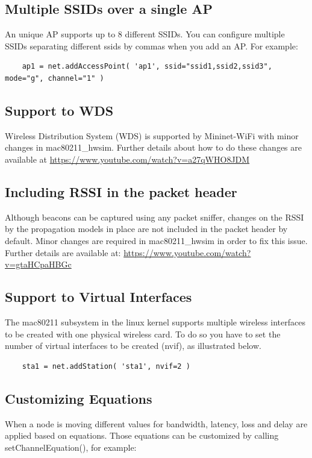\subsection{Multiple SSIDs over a single AP}
An unique AP supports up to 8 different SSIDs. You can configure multiple SSIDs separating different ssids by commas when you add an AP. For example:

\begin{verbatim}
    ap1 = net.addAccessPoint( 'ap1', ssid="ssid1,ssid2,ssid3", mode="g", channel="1" )
\end{verbatim}

\subsection{Support to WDS}
Wireless Distribution System (WDS) is supported by Mininet-WiFi with minor changes in mac80211\_hwsim. Further details about how to do these changes are available at \url{https://www.youtube.com/watch?v=a27qWHO8JDM}

\subsection{Including RSSI in the packet header}
Although beacons can be captured using any packet sniffer, changes on the RSSI by the propagation models in place are
not included in the packet header by default. Minor changes are required in mac80211\_hwsim in order to fix this issue. Further details are available at: \url{https://www.youtube.com/watch?v=gtaHCpaHBGc}

\subsection{Support to Virtual Interfaces}

The mac80211 subsystem in the linux kernel supports multiple wireless interfaces to be created with one physical wireless card. To do so you have to set the number of virtual interfaces to be created (nvif), as illustrated below.

\begin{verbatim}
    sta1 = net.addStation( 'sta1', nvif=2 )
\end{verbatim}

\subsection{Customizing Equations}
When a node is moving different values for bandwidth, latency, loss and delay are applied based on equations. Those equations can be customized by calling setChannelEquation(), for example:

